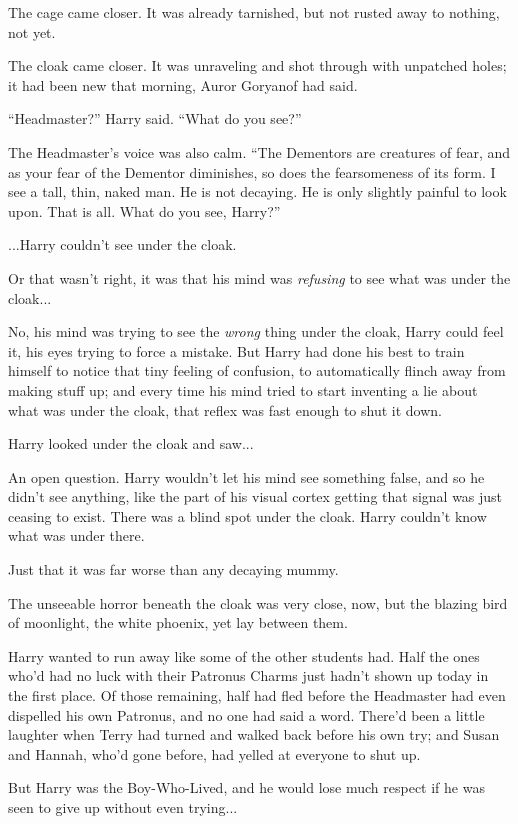The cage came closer. It was already tarnished, but not rusted away to
nothing, not yet.

The cloak came closer. It was unraveling and shot through with unpatched
holes; it had been new that morning, Auror Goryanof had said.

``Headmaster?'' Harry said. ``What do you see?''

The Headmaster's voice was also calm. ``The Dementors are creatures of
fear, and as your fear of the Dementor diminishes, so does the
fearsomeness of its form. I see a tall, thin, naked man. He is not
decaying. He is only slightly painful to look upon. That is all. What do
you see, Harry?''

...Harry couldn't see under the cloak.

Or that wasn't right, it was that his mind was \emph{refusing} to see
what was under the cloak...

No, his mind was trying to see the \emph{wrong} thing under the cloak,
Harry could feel it, his eyes trying to force a mistake. But Harry had
done his best to train himself to notice that tiny feeling of confusion,
to automatically flinch away from making stuff up; and every time his
mind tried to start inventing a lie about what was under the cloak, that
reflex was fast enough to shut it down.

Harry looked under the cloak and saw...

An open question. Harry wouldn't let his mind see something false, and
so he didn't see anything, like the part of his visual cortex getting
that signal was just ceasing to exist. There was a blind spot under the
cloak. Harry couldn't know what was under there.

Just that it was far worse than any decaying mummy.

The unseeable horror beneath the cloak was very close, now, but the
blazing bird of moonlight, the white phoenix, yet lay between them.

Harry wanted to run away like some of the other students had. Half the
ones who'd had no luck with their Patronus Charms just hadn't shown up
today in the first place. Of those remaining, half had fled before the
Headmaster had even dispelled his own Patronus, and no one had said a
word. There'd been a little laughter when Terry had turned and walked
back before his own try; and Susan and Hannah, who'd gone before, had
yelled at everyone to shut up.

But Harry was the Boy-Who-Lived, and he would lose much respect if he
was seen to give up without even trying...

